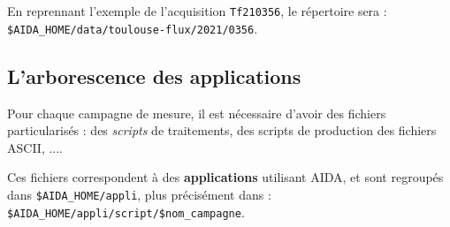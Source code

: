  En reprennant l'exemple de  l'acquisition \texttt{Tf210356}, le 
répertoire sera : \\
\texttt{\$AIDA\_HOME\//data\//toulouse-flux\//2021\//0356}.

\subsection{L'arborescence des applications} 
    Pour chaque campagne de mesure, il est nécessaire
d'avoir des fichiers particularisés : des \textit{scripts}
de traitements, des scripts de production des fichiers
ASCII, ....

     Ces fichiers correspondent à des \textbf{applications}
utilisant AIDA, et sont regroupés dans \texttt{\$AIDA\_HOME\//appli},
plus précisément dans :
\texttt{\$AIDA\_HOME\//appli\//script\//\$nom\_campagne}.


